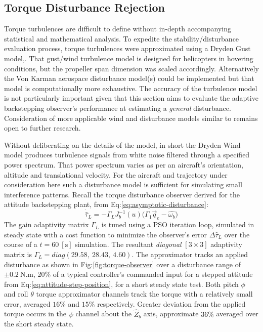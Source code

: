 \subsection{Torque Disturbance Rejection}
\label{subsec:simulation.disturbance.torque}
Torque turbulences are difficult to define without in-depth accompanying statistical and mathematical analysis. To expedite the stability/disturbance evaluation process, torque turbulences were approximated using a Dryden Gust model,\cite{optimalgust,discretegustmodel}. That gust/wind turbulence model is designed for helicopters in hovering conditions, but the propeller span dimension was scaled accordingly. Alternatively the Von Karman aerospace disturbance model(s) could be implemented but that model is computationally more exhaustive. The accuracy of the turbulence model is not particularly important given that this section aims to evaluate the adaptive backstepping observer's performance at estimating a \emph{general} disturbance. Consideration of more applicable wind and disturbance models similar to \cite{nonlineardynamics} remains open to further research.
\par
Without deliberating on the details of the model, in short the Dryden Wind model produces turbulence signals from white noise filtered through a specified power spectrum. That power spectrum varies as per an aircraft's orientation, altitude and translational velocity. For the aircraft and trajectory under consideration here such a disturbance model is sufficient for simulating small interference patterns. Recall the torque disturbance observer derived for the attitude backstepping plant, from Eq:\ref{eq:asymptotic-disturbance}:
\begin{equation}\label{eq:stability-torque-overserver}
\dot{\hat{\tau}}_L=-\Gamma_L J_b^{-1}(u)\big(\Gamma_1\vec{q}_e-\hat{\omega_b}\big)
\end{equation}
The gain adaptivity matrix $\Gamma_L$ is tuned using a PSO iteration loop, simulated in steady state with a cost function to minimize the observer's error $\Delta\hat{\tau}_L$ over the course of a $t=60~[\text{s}]$ simulation. The resultant \emph{diagonal} $[3\times 3]$ adaptivity matrix is $\Gamma_L=diag(29.58,~28.43,~4.60)$. The approximator tracks an applied disturbance as shown in Fig:\ref{fig:torque-observer} over a disturbance range of $\pm 0.2~\text{N.m}$, 20\% of a typical controller's commanded input for a stepped attitude from Eq:\ref{eq:attitude-step-position}, for a short steady state test. Both pitch $\phi$ and roll $\theta$ torque approximator channels track the torque with a relatively small error, averaged $16\%$ and $15\%$ respectively. Greater deviation from the applied torque occurs in the $\psi$ channel about the $\hat{Z}_b$ axis, approximate $36\%$ averaged over the short steady state.
